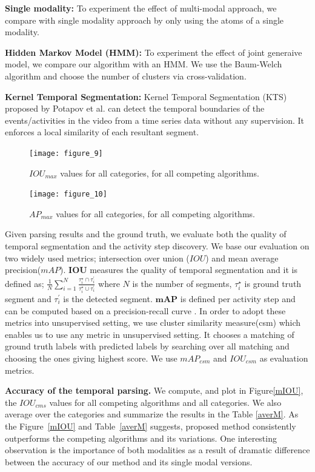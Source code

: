 \noindent\textbf{Single modality:}
To experiment the effect of multi-modal approach, we compare with single modality approach by only using the atoms of a single modality.

\noindent\textbf{Hidden Markov Model (HMM):}
To experiment the effect of joint generaive model, we compare our algorithm with an HMM. We use the Baum-Welch algorithm\cite{rabiner} and choose the number of clusters via cross-validation.


\noindent\textbf{Kernel Temporal Segmentation\cite{potapov2014category}:}
Kernel Temporal Segmentation (KTS) proposed by Potapov et al.\cite{potapov2014category} can detect the temporal boundaries of the events/activities in the video from a time series data without any supervision. It enforces a local similarity of each resultant segment.

\begin{figure}[t]
  \texttt{[image: figure\_9]}
  \vspace{-9mm}
  \caption{$IOU_{max}$ values for all categories, for all competing algorithms.}
  \label{mIOU}
\texttt{[image: figure\_10]}
\vspace{-9mm}
\caption{$AP_{max}$ values for all categories, for all competing algorithms.}
\vspace{-3mm}
\label{mmAP}
\end{figure}

Given parsing results and the ground truth, we evaluate both the quality of temporal segmentation and the activity step discovery. We base our evaluation on two widely used metrics; intersection over union ($IOU$) and mean average precision($mAP$). $\mathbf{IOU}$ measures the quality of temporal segmentation and it is defined as; $\frac{1}{N}\sum_{i=1}^N \frac{\tau^\star_i \cap \tau^\prime_{i}}{\tau^\star_i \cup \tau^\prime_{i}}$ where $N$ is the number of segments, $\tau^\star_i$ is ground truth  segment and $\tau^\prime_{i}$ is the detected segment. $\mathbf{mAP}$ is defined per activity step and can be computed based on a precision-recall curve \cite{THUMOS14}. In order to adopt these metrics into unsupervised setting, we use cluster similarity measure(csm)\cite{liao05} which enables us to use any metric in unsupervised setting. It chooses a matching of ground truth labels with predicted labels by searching over all matching and choosing the ones giving highest score. We use $mAP_{csm}$ and $IOU_{csm}$ as evaluation metrics.

\vspace{1mm}
\noindent\textbf{Accuracy of the temporal parsing.}
We compute, and plot in Figure\ref{mIOU}, the $IOU_{cms}$ values for all competing algorithms and all categories. We also average over the categories and summarize the results in the Table \ref{averM}. As the Figure~\ref{mIOU} and Table~\ref{averM} suggests, proposed method consistently outperforms the competing algorithms and its variations. One interesting observation is the importance of both modalities as a result of dramatic difference between the accuracy of our method and its single modal versions.

